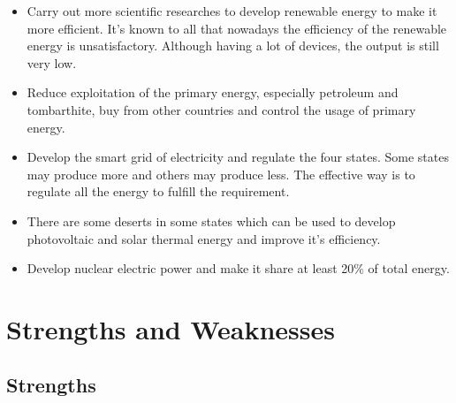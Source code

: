 \documentclass{mcmthesis}
\begin{document}
\begin{itemize}

\item Carry out more scientific researches to develop renewable energy to make it more efficient. It's known to all that nowadays the efficiency of the renewable energy is unsatisfactory. Although having a lot of devices, the output is still very low.

\item Reduce exploitation of the primary energy, especially petroleum and tombarthite, buy from other countries and control the usage of primary energy.

\item Develop the smart grid of electricity and regulate the four states. Some states may produce more and others may produce less. The effective way is to regulate all the energy to fulfill the requirement.

\item There are some deserts in some states which can be used to develop photovoltaic and solar thermal energy and improve it's efficiency.

\item Develop nuclear electric power and make it share at least 20\% of total energy.

\end{itemize}

\section{Strengths and Weaknesses}

\subsection{Strengths}
\end{document}
